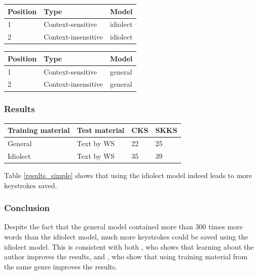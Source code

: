 \documentclass[12pt]{article}
\let\originaltable\table
\let\endoriginaltable\endtable
\renewenvironment{table}[1][ht]{%
  \originaltable[#1]
  \centering}%
  {\endoriginaltable}
\begin{document}
\begin{table}[H]
\begin{tabular}{lll} 
Position&Type&Model\\
\hline
1&Context-sensitive&idiolect\\
2&Context-insensitive&idiolect\\
\end{tabular} 
\caption{Module order for a simple idiolect simulation.} \label{idiolect_setup}  
\end{table}

\begin{table}[H]
\begin{tabular}{lll} 
Position&Type&Model\\
\hline
1&Context-sensitive&general\\
2&Context-insensitive&general\\
\end{tabular} 
\caption{Module order for a simulation for the general model.} \label{generalmodel_setup} 
\end{table}


\subsubsection{Results}

\begin{table}[H]
\begin{tabular}{ll|ll} 
Training material&Test material&CKS&SKKS\\
\hline
General &Text by WS&22&25\\
Idiolect&Text by WS&35&39\\
\end{tabular} 
\caption{Percentage of keystrokes that can be saved when using the general and the idiolect model} \label{results_simple}
\end{table}

Table \ref{results_simple} shows that  using the idiolect model indeed leads to more keystrokes saved. 

\subsubsection{Conclusion}
Despite the fact that the general model contained more than 300 times more words than the idiolect model, much more keystrokes could be saved using the idiolect model. This is consistent with both , who shows that learning about the author improves the results, and , who show that using training material from the same genre improves the results.
\end{document}

